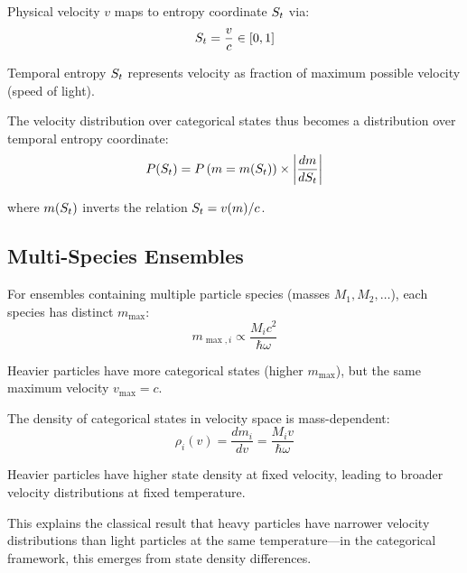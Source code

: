 \begin{definition}
\begin{definition}
\label{def:velocity_coordinate}
Physical velocity $v$ maps to entropy coordinate $S_t$ via:
\begin{equation}
S_t = \frac{v}{c} \in [0,1]
\end{equation}

Temporal entropy $S_t$ represents velocity as fraction of maximum possible velocity (speed of light).
\end{definition}

The velocity distribution over categorical states thus becomes a distribution over temporal entropy coordinate:
\begin{equation}
P(S_t) = P\left(m = m(S_t)\right) \times \left|\frac{dm}{dS_t}\right|
\end{equation}

where $m(S_t)$ inverts the relation $S_t = v(m)/c$.

\subsection{Multi-Species Ensembles}

For ensembles containing multiple particle species (masses $M_1, M_2, \ldots$), each species has distinct $m_{\max}$:
\begin{equation}
m_{\max,i} \propto \frac{M_i c^2}{\hbar\omega}
\end{equation}

Heavier particles have more categorical states (higher $m_{\max}$), but the same maximum velocity $v_{\max} = c$.

\begin{proposition}
\label{prop:species_density}
The density of categorical states in velocity space is mass-dependent:
\begin{equation}
\rho_i(v) = \frac{dm_i}{dv} = \frac{M_i v}{\hbar\omega}
\end{equation}

Heavier particles have higher state density at fixed velocity, leading to broader velocity distributions at fixed temperature.
\end{proposition}

This explains the classical result that heavy particles have narrower velocity distributions than light particles at the same temperature—in the categorical framework, this emerges from state density differences.



\end{definition}
